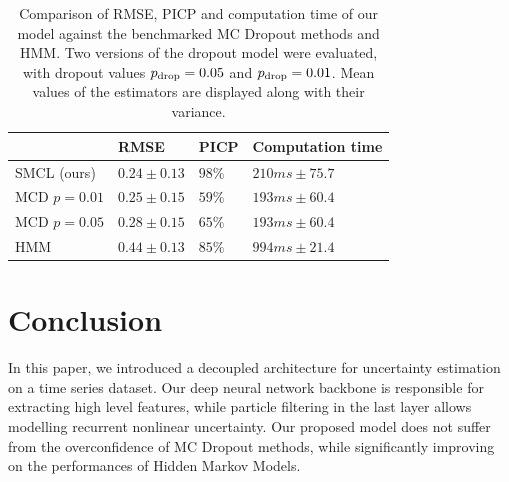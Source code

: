 \documentclass[conference]{IEEEtran}
\begin{document}
\begin{table}[htpb]
	\centering
	\caption{Comparison of RMSE, PICP and computation time of our model against the benchmarked MC Dropout methods and HMM.
		Two versions of the dropout model were evaluated, with dropout values $p_\textnormal{drop}=0.05$ and $p_\textnormal{drop}=0.01$.
		Mean values of the estimators are displayed along with their variance.}
	\begin{tabular}{llll}
		\toprule
		             & RMSE            & PICP   & Computation time  \\
		\toprule
		SMCL (ours)  & $0.24 \pm 0.13$ & $98\%$ & $210 ms \pm 75.7$ \\
		MCD $p=0.01$ & $0.25 \pm 0.15$ & $59\%$ & $193 ms \pm 60.4$ \\
		MCD $p=0.05$ & $0.28 \pm 0.15$ & $65\%$ & $193 ms \pm 60.4$ \\
		HMM          & $0.44 \pm 0.13$ & $85\%$ & $994 ms \pm 21.4$ \\
		\bottomrule
	\end{tabular}
	\label{tab:ci_comparison}
\end{table}


\section{Conclusion}%
\label{sec:conclusion}

In this paper, we introduced a decoupled architecture for uncertainty estimation on a time series dataset.
Our deep neural network backbone is responsible for extracting high level features, while particle filtering in the last layer allows modelling recurrent nonlinear uncertainty.
Our proposed model does not suffer from the overconfidence of MC Dropout methods, while significantly improving on the performances of Hidden Markov Models.
\end{document}
